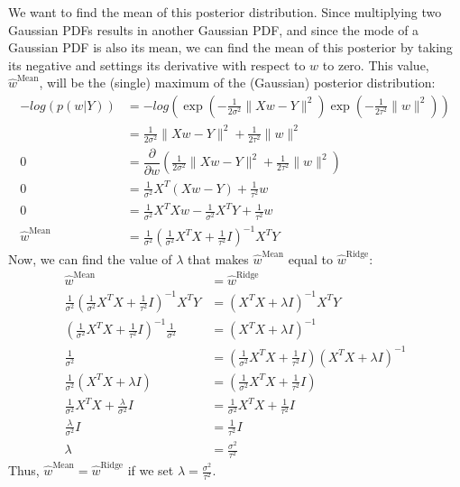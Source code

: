 \documentclass{article}
\begin{document}
We want to find the mean of this posterior distribution.
Since multiplying two Gaussian PDFs results in another Gaussian PDF, and since the mode of a Gaussian PDF is also its mean, we can find the mean of this posterior by taking its negative and settings its derivative with respect to $w$ to zero.
This value, $\hat{w}^{\text{Mean}}$, will be the (single) maximum of the (Gaussian) posterior distribution:
\begin{align*}
    -log(p(w|Y)) &= -log\left(\exp\left(-\frac{1}{2\sigma^2}\|Xw - Y\|^2\right)\exp\left(-\frac{1}{2\tau^2}\|w\|^2\right)\right)\\
    &= \frac{1}{2\sigma^2}\|Xw - Y\|^2 + \frac{1}{2\tau^2}\|w\|^2\\
    0 &= \dfrac{\partial}{\partial w}\left(\frac{1}{2\sigma^2}\|Xw - Y\|^2 + \frac{1}{2\tau^2}\|w\|^2\right)\\
    0 &= \frac{1}{\sigma^2}X^T(Xw - Y) + \frac{1}{\tau^2}w\\
    0 &= \frac{1}{\sigma^2}X^TXw - \frac{1}{\sigma^2}X^TY + \frac{1}{\tau^2}w\\
    \hat{w}^{\text{Mean}} &= \frac{1}{\sigma^2}\left(\frac{1}{\sigma^2}X^TX + \frac{1}{\tau^2}I\right)^{-1}X^TY
\end{align*}
Now, we can find the value of \(\lambda\) that makes \(\hat{w}^{\text{Mean}}\) equal to \(\hat{w}^{\text{Ridge}}\):
\begin{align*}
    \hat{w}^{\text{Mean}} &= \hat{w}^{\text{Ridge}}\\
    \frac{1}{\sigma^2}\left(\frac{1}{\sigma^2}X^TX + \frac{1}{\tau^2}I\right)^{-1}X^TY &= (X^T X + \lambda I)^{-1} X^T Y\\
    \left(\frac{1}{\sigma^2}X^TX + \frac{1}{\tau^2}I\right)^{-1}\frac{1}{\sigma^2}&= (X^T X + \lambda I)^{-1}\\
    \frac{1}{\sigma^2}&= \left(\frac{1}{\sigma^2}X^TX + \frac{1}{\tau^2}I\right)(X^T X + \lambda I)^{-1}\\
    \frac{1}{\sigma^2} (X^T X + \lambda I)&= \left(\frac{1}{\sigma^2}X^TX + \frac{1}{\tau^2}I\right)\\
    \frac{1}{\sigma^2} X^T X + \frac{\lambda}{\sigma^2} I &= \frac{1}{\sigma^2}X^TX + \frac{1}{\tau^2}I\\
    \frac{\lambda}{\sigma^2} I &= \frac{1}{\tau^2}I\\
    \lambda &= \frac{\sigma^2}{\tau^2}
\end{align*}
Thus, $\hat{w}^{\text{Mean}} = \hat{w}^{\text{Ridge}}$ if we set $\lambda = \frac{\sigma^2}{\tau^2}$.
\end{document}
